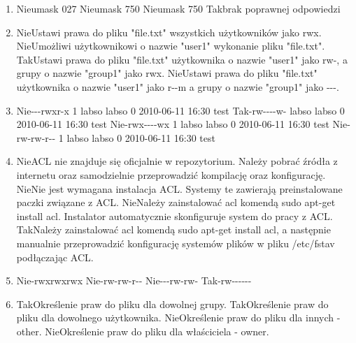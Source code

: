 \begin{enumerate}
	\item {}
	{Nie}{umask 027}
	{Nie}{umask 750}
	{Nie}{umask 750}
	{Tak}{brak poprawnej odpowiedzi}
	
	\item {}
	{Nie}{Ustawi prawa do pliku "file.txt" wszystkich użytkowników jako rwx.}
	{Nie}{Umożliwi użytkownikowi o nazwie "user1" wykonanie pliku "file.txt".}
	{Tak}{Ustawi prawa do pliku "file.txt" użytkownika o nazwie "user1" jako rw-, a grupy o nazwie "group1" jako rwx.}
	{Nie}{Ustawi prawa do pliku "file.txt" użytkownika o nazwie "user1" jako r-{}-m a grupy o nazwie "group1" jako -{}-{}-.}
	
	\item {}
	{Nie}{-{}-{}-rwxr-x 1 labso labso 0 2010-06-11 16:30 test}
	{Tak}{-rw-{}-{}-{}-w- labso labso 0 2010-06-11 16:30 test}
	{Nie}{-rwx-{}-{}-{}-wx 1 labso labso 0 2010-06-11 16:30 test}
	{Nie}{-rw-rw-r-{}- 1 labso labso 0 2010-06-11 16:30 test}
	
	\newpage
	
	\item {}
	{Nie}{ACL nie znajduje się oficjalnie w repozytorium. Należy pobrać źródła z internetu oraz samodzielnie przeprowadzić kompilację oraz konfigurację.}
	{Nie}{Nie jest wymagana instalacja ACL. Systemy te zawierają preinstalowane paczki związane z ACL.}
	{Nie}{Należy zainstalować acl komendą sudo apt-get install acl. Instalator automatycznie skonfiguruje system do pracy z ACL.}
	{Tak}{Należy zainstalować acl komendą sudo apt-get install acl, a następnie manualnie przeprowadzić konfigurację systemów plików w pliku /etc/fstav podłączając ACL.}
	
	\item {}
	{Nie}{-rwxrwxrwx}
	{Nie}{-rw-rw-r-{}-}
	{Nie}{-{}-{}-rw-rw-}
	{Tak}{-rw-{}-{}-{}-{}-{}-}
	
	\item {}
	{Tak}{Określenie praw do pliku dla dowolnej grupy.}
	{Tak}{Określenie praw do pliku dla dowolnego użytkownika.}
	{Nie}{Określenie praw do pliku dla innych - other.}
	{Nie}{Określenie praw do pliku dla właściciela - owner.}
	

\end{enumerate}
